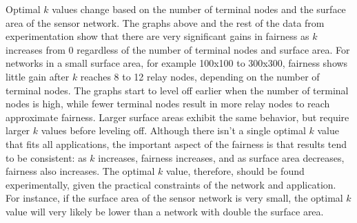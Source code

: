 Optimal $k$ values change based on the number of terminal nodes and the surface area of the sensor network.  The graphs above and the rest of the data from experimentation show that there are very significant gains in fairness as $k$ increases from 0 regardless of the number of terminal nodes and surface area.   For networks in a small surface area, for example 100x100 to 300x300, fairness shows little gain after $k$ reaches 8 to 12 relay nodes, depending on the number of terminal nodes.  The graphs start to level off earlier when the number of terminal nodes is high, while fewer terminal nodes result in more relay nodes to reach approximate fairness.  Larger surface areas exhibit the same behavior, but require larger $k$ values before leveling off.  Although there isn't a single optimal $k$ value that fits all applications, the important aspect of the fairness is that results tend to be consistent: as $k$ increases, fairness increases, and as surface area decreases, fairness also increases.
The optimal $k$ value, therefore, should be found experimentally, given the practical constraints of the network and application.  For instance, if the surface area of the sensor network is very small, the optimal $k$ value will very likely be lower than a network with double the surface area.
